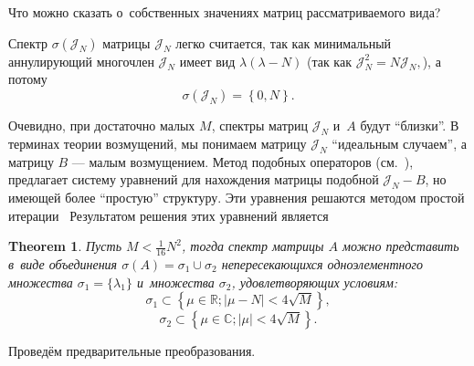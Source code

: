 \documentclass[14pt,a4paper]{extarticle}
\newtheorem{thm}{Theorem}
\theoremstyle{definition}
\begin{document}
Что можно сказать о~собственных значениях матриц рассматриваемого вида?

Спектр \( \sigma\left( \mathcal{J}_N \right) \)
 матрицы \( \mathcal{J}_N \) легко считается, так как минимальный аннулирующий
 многочлен \( \mathcal{J}_N \) имеет вид \( \lambda(\lambda - N) \) (так как \(
 \mathcal{J}_N^2 = N \mathcal{J}_N, \)), а потому
 \[ \sigma\left( \mathcal{J}_N \right) = \left\{ 0,N \right\}. \]

Очевидно, при достаточно малых \( M \),
спектры матриц \( \mathcal{J}_N \) и~\( A \) будут ``близки''.
В терминах теории возмущений, мы понимаем матрицу \( \mathcal{J}_N \)
``идеальным случаем'', а матрицу \( B \) --- малым возмущением.
Метод подобных операторов (см.~\cite{baskakov1986theorem,baskakov1987theorem,baskakov1994spectral,baskakov2002splitting}),
предлагает систему уравнений для нахождения матрицы подобной \( \mathcal{J}_N -
B \), но имеющей более ``простую'' структуру. Эти уравнения решаются методом
простой итерации~\cite{baskakov1986theorem,baskakov1987theorem,baskakov1994spectral,baskakov2002splitting}
Результатом решения этих уравнений
является
\begin{thm}\label{nk:thm:almost-all-ones}
    Пусть \( M < \frac{1}{16} N^2 \),
    тогда спектр матрицы \( A \) можно представить в~виде
    объединения \( \sigma\left(A\right) = \sigma_1 \cup \sigma_2 \)
    непересекающихся
    одноэлементного множества \( \sigma_1=\{\lambda_1\} \)
    и~множества \( \sigma_2 \), удовлетворяющих условиям:
    \[ \sigma_1 \subset \left\{ \mu\in\mathbb{R}; \lvert \mu - N \rvert < 4\sqrt{M} \right\}, \]
    \[ \sigma_2 \subset \left\{ \mu\in\mathbb{C}; \lvert \mu \rvert < 4\sqrt{M} \right\}. \]
\end{thm}

Провед\"ем предварительные преобразования.
\end{document}

